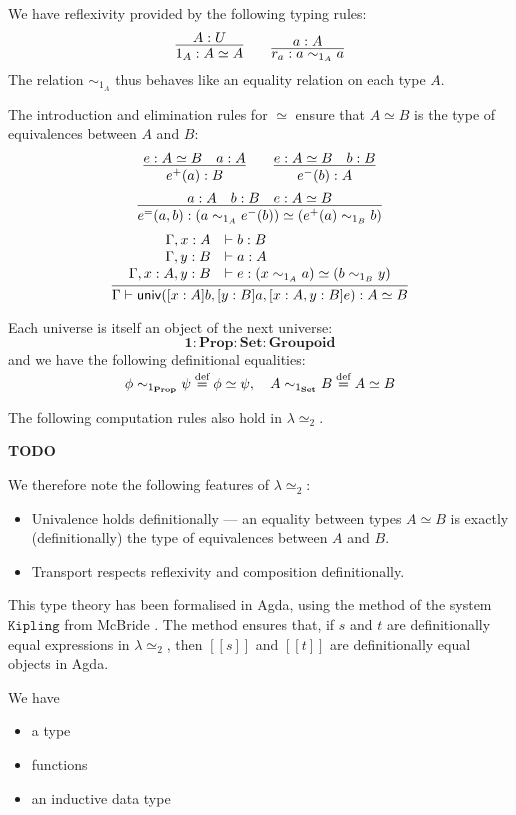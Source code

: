 \documentclass{easychair}
\newcommand{\Prop}{\ensuremath{\mathbf{Prop}}}
\newcommand{\Set}{\ensuremath{\mathbf{Set}}}
\newcommand{\Groupoid}{\ensuremath{\mathbf{Groupoid}}}
\newcommand{\LEtwo}{\ensuremath{\lambda \simeq_2}}
\newcommand{\eqdef}{\mathrel{\smash{\stackrel{\text{def}}{=}}}}
\newcommand{\brackets}[1]{\ensuremath{[ \! [ {#1} ] \! ]}}
\begin{document}
We have reflexivity provided by the following typing rules:
\[ \infer{1_A : A \simeq A}{A : U} \qquad \infer{r_a : a \sim_{1_A} a}{a : A} \]
The relation $\sim_{1_A}$ thus behaves like an equality relation on each type $A$.

The introduction and elimination rules for $\simeq$ ensure that $A \simeq B$ is the type of equivalences between $A$ and $B$:
\[ \infer{e^+(a) : B}{e : A \simeq B \quad a : A} \qquad \infer{e^-(b) : A}{e : A \simeq B \quad b : B} \]
\[ \infer{e^=(a,b) : (a \sim_{1_A} e^-(b)) \simeq (e^+(a) \sim_{1_B} b)}{a : A \quad b : B \quad e : A \simeq B} \]
\[ \infer{\Gamma \vdash \mathsf{univ}([x : A] b, [y : B] a, [x : A, y : B]e) : A \simeq B}{\begin{array}{rl}
\Gamma, x : A & \vdash b : B \\
\Gamma, y : B & \vdash a : A \\
\Gamma, x : A, y : B & \vdash e : (x \sim_{1_A} a) \simeq (b \sim_{1_B} y)
\end{array}} \]

Each universe is itself an object of the next universe:
\[ \mathbf{1} : \Prop : \Set : \Groupoid \]
and we have the following definitional equalities:
\[ \phi \sim_{1_\Prop} \psi \eqdef \phi \simeq \psi, \quad
A \sim_{1_\Set} B \eqdef A \simeq B \]

The following computation rules also hold in $\LEtwo$.

\textbf{TODO}

We therefore note the following features of $\LEtwo$:
\begin{itemize}
\item
Univalence holds definitionally --- an equality between types $A \simeq B$ is exactly (definitionally) the type of equivalences between $A$ and $B$.
\item
Transport respects reflexivity and composition definitionally.
\end{itemize}

This type theory has been formalised in Agda, using the method of the system $\mathtt{Kipling}$ from McBride \cite{McBridea}.  The method ensures that, if $s$ and $t$ are definitionally equal expressions in $\lambda \simeq_2$, then $\brackets{s}$ and $\brackets{t}$ are definitionally equal objects in Agda.

We have
\begin{itemize}
\item
a type 
\item
functions
\item
an inductive data type
\end{itemize}
\end{document}
